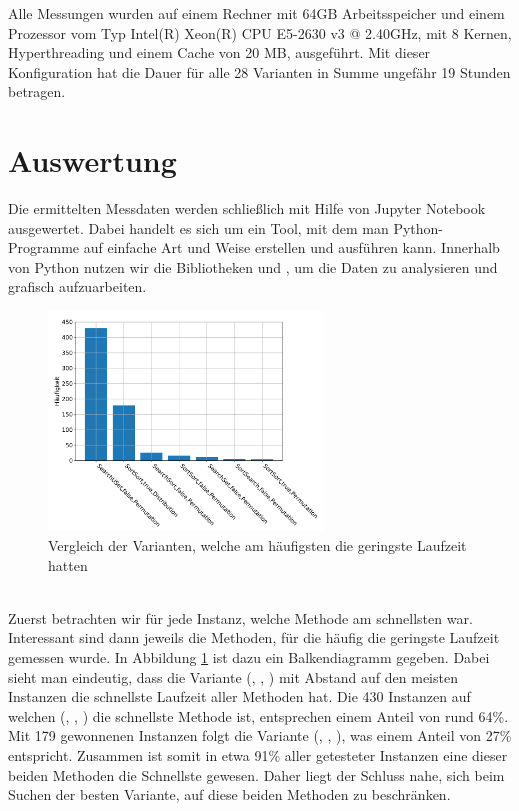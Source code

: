Alle Messungen wurden auf einem Rechner mit 64GB Arbeitsspeicher und einem Prozessor vom Typ Intel(R) Xeon(R) CPU E5-2630 v3 @ 2.40GHz,
mit 8 Kernen, Hyperthreading und einem Cache von 20 MB, ausgeführt.
Mit dieser Konfiguration hat die Dauer für alle 28 Varianten in Summe ungefähr 19 Stunden betragen.





\section{Auswertung}
\label{ref:auswertung}
Die ermittelten Messdaten werden schließlich mit Hilfe von 
Jupyter Notebook \cite{jupyter} ausgewertet. Dabei
handelt es sich um ein Tool, mit dem man Python-Programme auf einfache Art und Weise erstellen und 
ausführen kann.
Innerhalb von Python nutzen wir die Bibliotheken  und , um die Daten
zu analysieren und grafisch aufzuarbeiten.
\begin{figure}
\centering
	\includegraphics[width = 0.65\textwidth]{figures/counting.pdf}
	\caption{Vergleich der Varianten, welche am häufigsten die geringste Laufzeit hatten}
	\label{fig:messung_counting}
\end{figure}
\\

Zuerst betrachten wir für jede Instanz, welche Methode am schnellsten war.
Interessant sind dann jeweils die Methoden, für die häufig die geringste Laufzeit gemessen wurde.
In Abbildung \ref{fig:messung_counting} ist dazu ein Balkendiagramm gegeben.
Dabei sieht man eindeutig, dass die Variante (\SeaUSet, \false, \perm) mit Abstand 
auf den meisten Instanzen die schnellste Laufzeit aller Methoden hat. Die
430 Instanzen auf welchen (\SeaUSet, \false, \perm) die schnellste Methode ist, entsprechen einem Anteil von rund
64\%. Mit 179 \glqq gewonnenen\grqq{} Instanzen folgt die Variante (\SorSor, \true, \distr), was einem Anteil von
27\% entspricht. Zusammen ist somit in etwa 91\% aller getesteter Instanzen eine dieser beiden Methoden
die Schnellste gewesen. Daher liegt der Schluss nahe, sich beim Suchen der \glqq besten\grqq{} Variante,
auf diese beiden Methoden zu beschränken. 
\\

